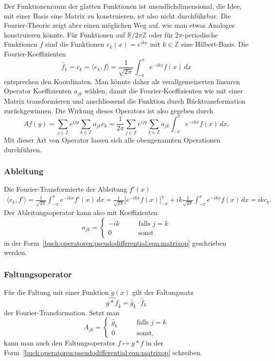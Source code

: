 Der Funktionenraum der glatten Funktionen ist unendlichdimensional, die
Idee, mit einer Basis eine Matrix zu konstruieren, ist also nicht
durchführbar.
Die Fourier-Theorie zeigt aber einen möglichen Weg auf, wie man etwas
Analoges konstruieren könnte.
Für Funktionen auf $\mathbb{R}/2\pi\mathbb{Z}$ oder für $2\pi$-periodische
Funktionen $f$ sind die Funktionen $e_k(x)=e^{ikx}$ mit $k\in\mathbb{Z}$ 
eine Hilbert-Basis.
Die Fourier-Koeffizienten
\[
\hat{f}_k
=
c_k
=
\langle e_k,f\rangle
=
\frac{1}{\!\sqrt{2\pi}}
\int_{-\pi}^{\pi} e^{-ikx}f(x)\,dx
\]
entsprechen den Koordinaten.
Man könnte daher als verallgemeinerten linearen Operator Koeffizienten
$a_{jk}$ wählen, damit die Fourier-Koeffizienten wie mit einer Matrix
transformieren und anschliessend die Funktion durch Rücktransformation
zurückgewinnen.
Die Wirkung dieses Operators ist also gegeben durch
\begin{equation}
Af(y)
=
\sum_{j\in\mathbb{Z}}
e^{i\!jy}
\sum_{k\in\mathbb{Z}} a_{jk}
c_k
=
\frac{1}{2\pi}
\sum_{j\in\mathbb{Z}}
e^{i\!jy}
\sum_{k\in\mathbb{Z}} a_{jk}
\int_{-\pi}^\pi e^{-ikx} f(x)\,dx.
\label{buch:operatoren:pseudodifferential:eqn:matrixop}
\end{equation}
Mit dieser Art von Operator lassen sich alle obengenannten Operationen
durchführen.

\subsubsection{Ableitung}
Die Fourier-Transformierte der Ableitung $f'(x)$
\begin{align*}
\langle e_k,f'\rangle
=
\frac{1}{\!\sqrt{2\pi}}
\int_{-\pi}^\pi e^{-ikx}f'(x)\,dx
=
\frac{1}{\!\sqrt{2\pi}}
\biggl[
e^{-ikx}
f(x)
\biggr]_{-\pi}^\pi
+ik
\frac{1}{\!\sqrt{2\pi}}
\int_{-\pi}^\pi e^{-ikx} f(x)\,dx
=
ikc_k.
\end{align*}
Der Ableitungsoperator kann also mit Koeffizienten
\[
a_{jk}
=
\begin{cases}
-ik&\qquad\text{falls $j=k$}\\
0  &\qquad\text{sonst}
\end{cases}
\]
in der Form~\eqref{buch:operatoren:pseudodifferential:eqn:matrixop}
geschrieben werden.

\subsubsection{Faltungsoperator}
Für die Faltung mit einer Funktion $g(x)$ gilt der Faltungssatz
\[
\widehat{g*f}_k
=
\hat{g}_k\cdot \hat{f}_k
\]
der Fourier-Transformation.
Setzt man
\[
A_{jk}
=
\begin{cases}
\hat{g}_k&\qquad\text{falls $j=k$}\\
0        &\qquad\text{sonst,}
\end{cases}
\]
kann man auch den Faltungsoperator $f\mapsto g*f$ in der 
Form~\eqref{buch:operatoren:pseudodifferential:eqn:matrixop}
schreiben.

